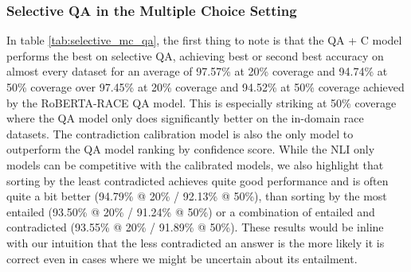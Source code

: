 \documentclass[11pt]{article}
\begin{document}
\subsubsection{Selective QA in the Multiple Choice Setting}
In table \ref{tab:selective_mc_qa}, the first thing to note is that the QA + C model performs the best on selective QA, achieving best or second best accuracy on almost every dataset for an average of 97.57\% at 20\% coverage and 94.74\% at 50\% coverage over 97.45\% at 20\% coverage and 94.52\% at 50\% coverage achieved by the RoBERTA-RACE QA model. This is especially striking at 50\% coverage where the QA model only does significantly better on the in-domain race datasets. The contradiction calibration model is also the only model to outperform the QA model ranking by confidence score. While the NLI only models can be competitive with the calibrated models, we also highlight that sorting by the least contradicted achieves quite good performance and is often quite a bit better (94.79\% @ 20\% / 92.13\% @ 50\%), than sorting by the most entailed (93.50\% @ 20\% / 91.24\% @ 50\%) or a combination of entailed and contradicted (93.55\% @ 20\% / 91.89\% @ 50\%). These results would be inline with our intuition that the less contradicted an answer is the more likely it is correct even in cases where we might be uncertain about its entailment.
\end{document}
